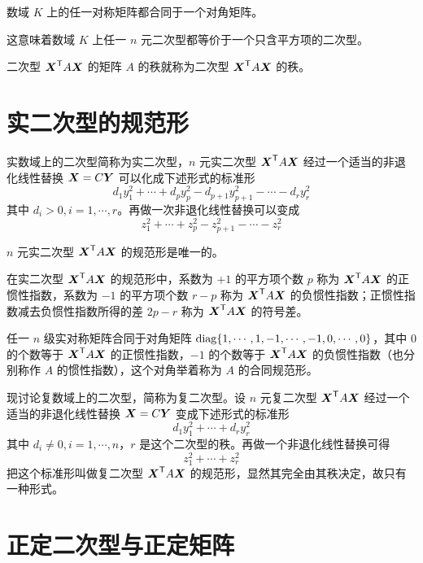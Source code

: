 \begin{theorem}
    数域 $K$ 上的任一对称矩阵都合同于一个对角矩阵。
\end{theorem}

这意味着数域 $K$ 上任一 $n$ 元二次型都等价于一个只含平方项的二次型。

二次型 ${\boldsymbol{X}}^\mathsf{T}A\boldsymbol{X}$ 的矩阵 $A$ 的秩就称为二次型 ${\boldsymbol{X}}^\mathsf{T}A\boldsymbol{X}$ 的秩。

\section{实二次型的规范形}

实数域上的二次型简称为实二次型，$n$ 元实二次型 ${\boldsymbol{X}}^\mathsf{T}A\boldsymbol{X}$ 经过一个适当的非退化线性替换 $\boldsymbol{X} = C\boldsymbol{Y}$ 可以化成下述形式的标准形
$$d_1y_1^2+\cdots+d_py_p^2-d_{p+1}y_{p+1}^2-\cdots-d_ry_r^2$$
其中 $d_i>0,i=1,\cdots,r$。再做一次非退化线性替换可以变成
$$z_1^2+\cdots+z_p^2-z_{p+1}^2-\cdots-z_r^2$$

\begin{theorem}
    $n$ 元实二次型 ${\boldsymbol{X}}^\mathsf{T}A\boldsymbol{X}$ 的规范形是唯一的。
\end{theorem}

\begin{definition}
    在实二次型 ${\boldsymbol{X}}^\mathsf{T}A\boldsymbol{X}$ 的规范形中，系数为 $+1$ 的平方项个数 $p$ 称为 ${\boldsymbol{X}}^\mathsf{T}A\boldsymbol{X}$ 的正惯性指数，系数为 $-1$ 的平方项个数 $r-p$ 称为 ${\boldsymbol{X}}^\mathsf{T}A\boldsymbol{X}$ 的负惯性指数；正惯性指数减去负惯性指数所得的差 $2p-r$ 称为 ${\boldsymbol{X}}^\mathsf{T}A\boldsymbol{X}$ 的符号差。
\end{definition}

任一 $n$ 级实对称矩阵合同于对角矩阵 $\operatorname{diag}\{1,\cdots,1,-1,\cdots,-1,0,\cdots,0\}$，其中 $0$ 的个数等于 ${\boldsymbol{X}}^\mathsf{T}A\boldsymbol{X}$ 的正惯性指数，$-1$ 的个数等于 ${\boldsymbol{X}}^\mathsf{T}A\boldsymbol{X}$ 的负惯性指数（也分别称作 $A$ 的惯性指数），这个对角举着称为 $A$ 的合同规范形。

现讨论复数域上的二次型，简称为复二次型。设 $n$ 元复二次型 ${\boldsymbol{X}}^\mathsf{T}A\boldsymbol{X}$ 经过一个适当的非退化线性替换 $\boldsymbol{X} = C\boldsymbol{Y}$ 变成下述形式的标准形
$$d_1y_1^2+\cdots+d_ry_r^2$$
其中 $d_i\ne 0,i=1,\cdots,n$，$r$ 是这个二次型的秩。再做一个非退化线性替换可得
$$z_1^2+\cdots+z_r^2$$
把这个标准形叫做复二次型 ${\boldsymbol{X}}^\mathsf{T}A\boldsymbol{X}$ 的规范形，显然其完全由其秩决定，故只有一种形式。

\section{正定二次型与正定矩阵}

